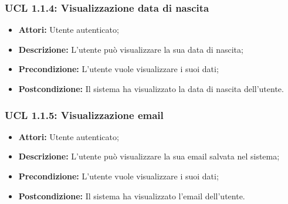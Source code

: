 \hypertarget{L1.1.4}{}
\subsubsection{UCL 1.1.4: Visualizzazione data di nascita}
\begin{itemize}
	\item \textbf{Attori:} Utente autenticato;
	\item \textbf{Descrizione:} L'utente può visualizzare la sua data di nascita;
	\item \textbf{Precondizione:} L'utente vuole visualizzare i suoi dati;
	\item \textbf{Postcondizione:} Il sistema ha visualizzato la data di nascita dell'utente.
\end{itemize}

\hypertarget{L1.1.5}{}
\subsubsection{UCL 1.1.5: Visualizzazione email}
\begin{itemize}
	\item \textbf{Attori:} Utente autenticato;
	\item \textbf{Descrizione:} L'utente può visualizzare la sua email salvata nel sistema;
	\item \textbf{Precondizione:} L'utente vuole visualizzare i suoi dati;
	\item \textbf{Postcondizione:} Il sistema ha visualizzato l'email dell'utente.
\end{itemize}

 
\hypertarget{L1.2}{}
